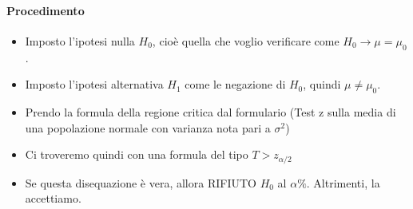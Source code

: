 \paragraph{Procedimento}
\begin{itemize}
    \item Imposto l'ipotesi nulla $H_0$, cioè quella che voglio verificare come $H_0 \to \mu = \mu_0$.
    \item Imposto l'ipotesi alternativa $H_1$ come le negazione di $H_0$, quindi $\mu \neq \mu_0$.
    \item Prendo la formula della regione critica dal formulario (Test z sulla media di una popolazione normale con varianza nota pari a $\sigma^2$)
    \item Ci troveremo quindi con una formula del tipo $T>z_{\alpha/2}$
    \item Se questa disequazione è vera, allora RIFIUTO $H_0$ al $\alpha \%$. Altrimenti, la accettiamo.
\end{itemize}
